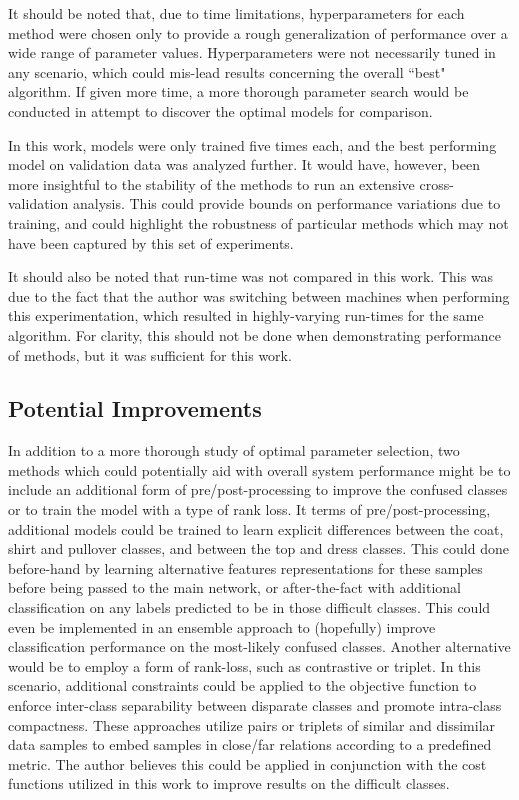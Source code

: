 \documentclass[conference]{IEEEtran}
\begin{document}
It should be noted that, due to time limitations, hyperparameters for each method were chosen only to provide a rough generalization of performance over a wide range of parameter values.  Hyperparameters were not necessarily tuned in any scenario, which could mis-lead results concerning the overall ``best" algorithm.  If given more time, a more thorough parameter search would be conducted in attempt to discover the optimal models for comparison.

In this work, models were only trained five times each, and the best performing model on validation data was analyzed further.  It would have, however, been more insightful to the stability of the methods to run an extensive cross-validation analysis.  This could provide bounds on performance variations due to training, and could highlight the robustness of particular methods which may not have been captured by this set of experiments.

It should also be noted that run-time was not compared in this work.  This was due to the fact that the author was switching between machines when performing this experimentation, which resulted in highly-varying run-times for the same algorithm.  For clarity, this should not be done when demonstrating performance of methods, but it was sufficient for this work. 





\subsection{Potential Improvements}
In addition to a more thorough study of optimal parameter selection, two methods which could potentially aid with overall system performance might be to include an additional form of pre/post-processing to improve the confused classes or to train the model with a type of rank loss.  It terms of pre/post-processing, additional models could be trained to learn explicit differences between the coat, shirt and  pullover classes, and between the top and dress classes.  This could done before-hand by learning alternative  features representations for these samples before being passed to the main network, or after-the-fact with additional classification on any labels predicted to be in those difficult classes.  This could even be implemented in an ensemble approach to (hopefully) improve classification performance on the most-likely confused classes.  Another alternative  would be to employ a form of rank-loss, such as contrastive or triplet.  In this scenario, additional constraints could be applied to the objective function to enforce inter-class separability between disparate classes and promote intra-class compactness.  These approaches utilize pairs or triplets of similar and  dissimilar data samples to embed samples  in close/far relations according to a predefined metric.  The author believes this could be applied  in conjunction with the cost functions utilized in this work to improve results on the difficult classes.
\end{document}
